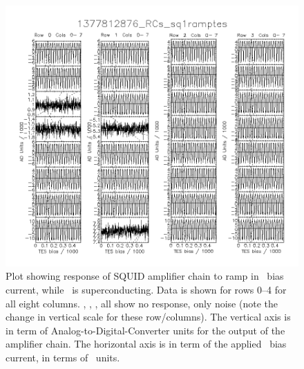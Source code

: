 \begin{figure}[th]
\centering
\includegraphics[width=\textwidth]{./images/1377812876_RCs_sq1ramptes_00.png}
\caption{Plot showing response of SQUID amplifier chain to ramp in \TES\ bias current, while \TES\ is superconducting.
  Data is shown for rows 0--4 for all eight columns.
  , , ,  all show no response, only noise (note the change in vertical scale for these row/columns).
  The vertical axis is in term of Analog-to-Digital-Converter units for the output of the \SQUID amplifier chain.
  The horizontal axis is in term of the applied \TES\ bias current, in terms of \DAC\ units.
}
\label{fig:tes-bias-ramp-sc}
\end{figure}

